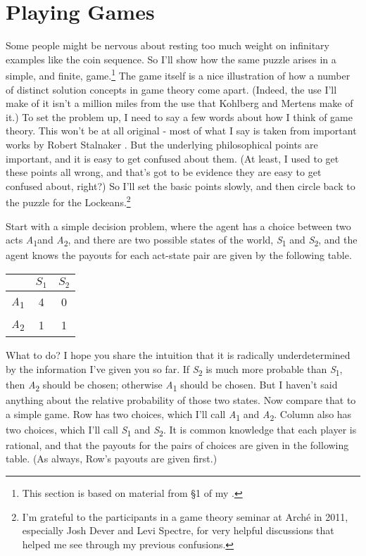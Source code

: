 \documentclass[
  11pt,
]{book}
\begin{document}
\hypertarget{lockegames}{%
\section{Playing Games}\label{lockegames}}

Some people might be nervous about resting too much weight on infinitary examples like the coin sequence. So I'll show how the same puzzle arises in a simple, and finite, game.\footnote{This section is based on material from §1 of my \citeyearpar{Weatherson2016}.} The game itself is a nice illustration of how a number of distinct solution concepts in game theory come apart. (Indeed, the use I'll make of it isn't a million miles from the use that Kohlberg and Mertens \citeyearpar{KohlbergMertens1986} make of it.) To set the problem up, I need to say a few words about how I think of game theory. This won't be at all original - most of what I say is taken from important works by Robert Stalnaker \citetext{\citeyear{Stalnaker1994}; \citeyear{Stalnaker1996}; \citeyear{Stalnaker1998}; \citeyear{Stalnaker1999}}. But the underlying philosophical points are important, and it is easy to get confused about them. (At least, I used to get these points all wrong, and that's got to be evidence they are easy to get confused about, right?) So I'll set the basic points slowly, and then circle back to the puzzle for the Lockeans.\footnote{I'm grateful to the participants in a game theory seminar at Arché in 2011, especially Josh Dever and Levi Spectre, for very helpful discussions that helped me see through my previous confusions.}

Start with a simple decision problem, where the agent has a choice between two acts \emph{A}\textsubscript{1}and \emph{A}\textsubscript{2}, and there are two possible states of the world, \emph{S}\textsubscript{1} and \emph{S}\textsubscript{2}, and the agent knows the payouts for each act-state pair are given by the following table.

\begin{longtable}[]{@{}lcc@{}}
\toprule()
& \(S_1\) & \(S_2\) \\
\midrule()
\endhead
\emph{A}\textsubscript{1} & 4 & 0 \\
\emph{A}\textsubscript{2} & 1 & 1 \\
\bottomrule()
\end{longtable}

What to do? I hope you share the intuition that it is radically underdetermined by the information I've given you so far. If \emph{S}\textsubscript{2} is much more probable than \emph{S}\textsubscript{1}, then \emph{A}\textsubscript{2} should be chosen; otherwise \emph{A}\textsubscript{1} should be chosen. But I haven't said anything about the relative probability of those two states. Now compare that to a simple game. Row has two choices, which I'll call \emph{A}\textsubscript{1} and \emph{A}\textsubscript{2}. Column also has two choices, which I'll call \emph{S}\textsubscript{1} and \emph{S}\textsubscript{2}. It is common knowledge that each player is rational, and that the payouts for the pairs of choices are given in the following table. (As always, Row's payouts are given first.)
\end{document}
